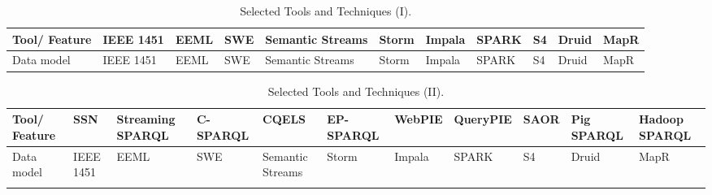 \begin{sidewaystable}[!ht]
\renewcommand{\arraystretch}{1.3}
\tiny
\begin{center}
\begin{tabular}[c]{|p{1.5cm}|p{1.5cm}|p{1.5cm}|p{1.5cm}|p{1.5cm}|p{1.5cm}|p{1.5cm}|p{1.5cm}|p{1.5cm}|p{1.5cm}|p{1.5cm}|} 
\hline
 \textbf{Tool/ Feature} & IEEE 1451 &  EEML & SWE & Semantic Streams & Storm & Impala & SPARK & S4 & Druid & MapR\\ \hline
  Data model & IEEE 1451 &  EEML & SWE & Semantic Streams & Storm & Impala & SPARK & S4 & Druid & MapR\\ \hline 
  
\hline
\end{tabular}
\caption{Selected Tools and Techniques (I).}\label{table:tools-1}
  \end{center}
\end{sidewaystable} 

\begin{sidewaystable}[!ht]
\renewcommand{\arraystretch}{1.3}
\tiny
\begin{center}
\begin{tabular}[c]{|p{1.5cm}|p{1.5cm}|p{1.5cm}|p{1.5cm}|p{1.5cm}|p{1.5cm}|p{1.5cm}|p{1.5cm}|p{1.5cm}|p{1.5cm}|p{1.5cm}|} 
\hline
 \textbf{Tool/ Feature} & SSN &  Streaming SPARQL & C-SPARQL & CQELS & EP-SPARQL & WebPIE & QueryPIE & SAOR & Pig SPARQL & Hadoop SPARQL  \\ \hline
  Data model & IEEE 1451 &  EEML & SWE & Semantic Streams & Storm & Impala & SPARK & S4 & Druid & MapR\\ \hline  \\ \hline
\hline
\end{tabular}
\caption{Selected Tools and Techniques (II).}\label{table:tools-ii}
  \end{center}
\end{sidewaystable} 

